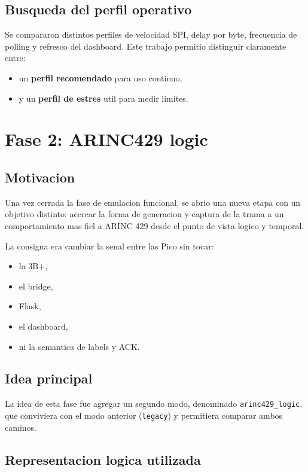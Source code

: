 \documentclass[12pt,a4paper,oneside]{report}
\begin{document}
\section{Busqueda del perfil operativo}

Se compararon distintos perfiles de velocidad SPI, delay por byte, frecuencia de polling y refresco del dashboard. Este trabajo permitio distinguir claramente entre:

\begin{itemize}[leftmargin=1.2cm]
    \item un \textbf{perfil recomendado} para uso continuo,
    \item y un \textbf{perfil de estres} util para medir limites.
\end{itemize}

\chapter{Fase 2: ARINC429 logic}

\section{Motivacion}

Una vez cerrada la fase de emulacion funcional, se abrio una nueva etapa con un objetivo distinto: acercar la forma de generacion y captura de la trama a un comportamiento mas fiel a ARINC 429 desde el punto de vista logico y temporal.

La consigna era cambiar la senal entre las Pico sin tocar:

\begin{itemize}[leftmargin=1.2cm]
    \item la 3B+,
    \item el bridge,
    \item Flask,
    \item el dashboard,
    \item ni la semantica de labels y ACK.
\end{itemize}

\section{Idea principal}

La idea de esta fase fue agregar un segundo modo, denominado \texttt{arinc429\_logic}, que conviviera con el modo anterior (\texttt{legacy}) y permitiera comparar ambos caminos.

\section{Representacion logica utilizada}
\end{document}

